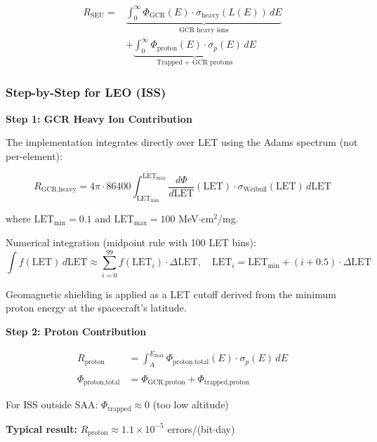 \documentclass[11pt,a4paper]{article}
\begin{document}
\begin{align}
R_{\text{SEU}} = &\underbrace{\int_0^\infty \Phi_{\text{GCR}}(E) \cdot \sigma_{\text{heavy}}(L(E)) \, dE}_{\text{GCR heavy ions}} \nonumber \\
&+ \underbrace{\int_0^\infty \Phi_{\text{proton}}(E) \cdot \sigma_p(E) \, dE}_{\text{Trapped + GCR protons}}
\end{align}

\subsubsection{Step-by-Step for LEO (ISS)}

\textbf{Step 1: GCR Heavy Ion Contribution}

The implementation integrates directly over LET using the Adams spectrum (not per-element):

\begin{equation}
R_{\text{GCR,heavy}} = 4\pi \cdot 86400 \int_{\text{LET}_{\min}}^{\text{LET}_{\max}} \frac{d\Phi}{d\text{LET}}(\text{LET}) \cdot \sigma_{\text{Weibull}}(\text{LET}) \, d\text{LET}
\end{equation}

where $\text{LET}_{\min} = 0.1$ and $\text{LET}_{\max} = 100$ MeV$\cdot$cm$^2$/mg.

Numerical integration (midpoint rule with 100 LET bins):
\begin{equation}
\int f(\text{LET}) \, d\text{LET} \approx \sum_{i=0}^{99} f(\text{LET}_i) \cdot \Delta\text{LET}, \quad \text{LET}_i = \text{LET}_{\min} + (i + 0.5) \cdot \Delta\text{LET}
\end{equation}

Geomagnetic shielding is applied as a LET cutoff derived from the minimum proton energy at the spacecraft's latitude.

\textbf{Step 2: Proton Contribution}

\begin{align}
R_{\text{proton}} &= \int_{A}^{E_{\max}} \Phi_{\text{proton,total}}(E) \cdot \sigma_p(E) \, dE \\
\\
\Phi_{\text{proton,total}} &= \Phi_{\text{GCR,proton}} + \Phi_{\text{trapped,proton}}
\end{align}

For ISS outside SAA: $\Phi_{\text{trapped}} \approx 0$ (too low altitude)

\textbf{Typical result:} $R_{\text{proton}} \approx 1.1 \times 10^{-5}$ errors/(bit$\cdot$day)
\end{document}
